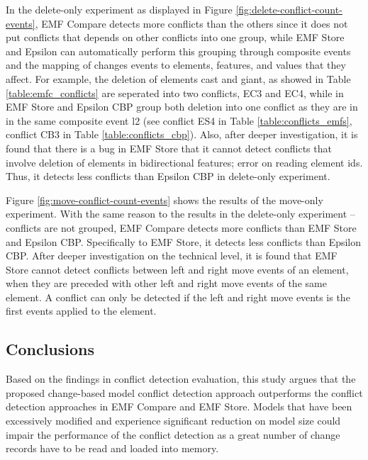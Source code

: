 In the delete-only experiment as displayed in Figure \ref{fig:delete-conflict-count-events}, EMF Compare detects more conflicts than the others since it does not put conflicts that depends on other conflicts into one group, while EMF Store and Epsilon can automatically perform this grouping through composite events and the mapping of changes events to elements, features, and values that they affect. For example, the deletion of elements \textsf{cast} and \textsf{giant}, as showed in Table \ref{table:emfc_conflicts} are seperated into two conflicts, EC3 and EC4, while in EMF Store and Epsilon CBP group both deletion into one conflict as they are in in the same composite event \textsf{l2} (see conflict ES4 in Table \ref{table:conflicts_emfs}, conflict CB3 in Table \ref{table:conflicts_cbp}). Also, after deeper investigation, it is found that there is a bug in EMF Store that it cannot detect conflicts that involve deletion of elements in bidirectional features; error on reading element ids. Thus, it detects less conflicts than Epsilon CBP in delete-only experiment. 

Figure \ref{fig:move-conflict-count-events} shows the results of the move-only experiment. With the same reason to the results in the delete-only experiment -- conflicts are not grouped, EMF Compare detects more conflicts than EMF Store and Epsilon CBP. Specifically to EMF Store, it detects less conflicts than Epsilon CBP. After deeper investigation on the technical level, it is found that EMF Store cannot detect conflicts between left and right move events of an element, when they are preceded with other left and right move events of the same element. A conflict can only be detected if the left and right move events is the first events applied to the element.

\subsection{Conclusions}
\label{sec:conclusions_7}
Based on the findings in conflict detection evaluation, this study argues that the proposed change-based model conflict detection approach outperforms the conflict detection approaches in EMF Compare and EMF Store. Models that have been excessively modified and experience significant reduction on model size could impair the performance of the conflict detection as a great number of change records have to be read and loaded into memory. 


